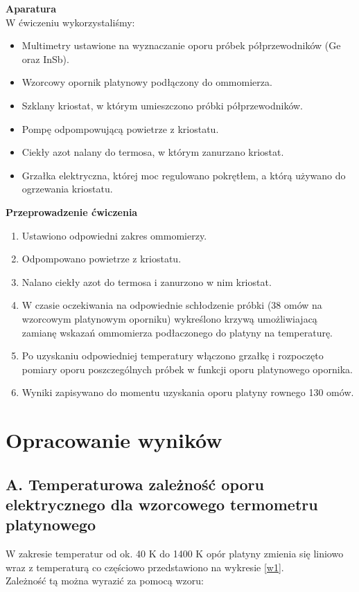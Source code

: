 \documentclass[11pt]{article}
\begin{document}
\textbf{Aparatura}\\
W ćwiczeniu wykorzystaliśmy:\begin{itemize}
\item Multimetry ustawione na wyznaczanie oporu próbek półprzewodników (Ge oraz InSb).
\item Wzorcowy opornik platynowy podłączony do ommomierza.
\item Szklany kriostat, w którym umieszczono próbki półprzewodników.
\item Pompę odpompowującą powietrze z kriostatu.
\item Ciekły azot nalany do termosa, w którym zanurzano kriostat.
\item Grzałka elektryczna, której moc regulowano pokrętłem, a którą używano do ogrzewania kriostatu.
\end{itemize}
\textbf{Przeprowadzenie ćwiczenia} \begin{enumerate}
\item Ustawiono odpowiedni zakres ommomierzy.
\item Odpompowano powietrze z kriostatu.
\item Nalano ciekły azot do termosa i zanurzono w nim kriostat.
\item W czasie oczekiwania na odpowiednie schłodzenie próbki (38 omów na wzorcowym platynowym oporniku) wykreślono krzywą umożliwiajacą zamianę wskazań ommomierza podłaczonego do platyny na temperaturę.
\item Po uzyskaniu odpowiedniej temperatury włączono grzałkę i rozpoczęto pomiary oporu poszczególnych próbek w funkcji oporu platynowego opornika.
\item Wyniki zapisywano do momentu uzyskania oporu platyny rownego 130 omów.
\end{enumerate}

\section*{Opracowanie wyników}
\subsection*{A. Temperaturowa zależność oporu elektrycznego dla wzorcowego termometru platynowego}
W zakresie temperatur od ok. 40 K do 1400 K opór platyny zmienia się liniowo wraz z temperaturą co częściowo przedstawiono na wykresie \ref{w1}.\\
Zależność tą można wyrazić za pomocą wzoru:
\end{document}
